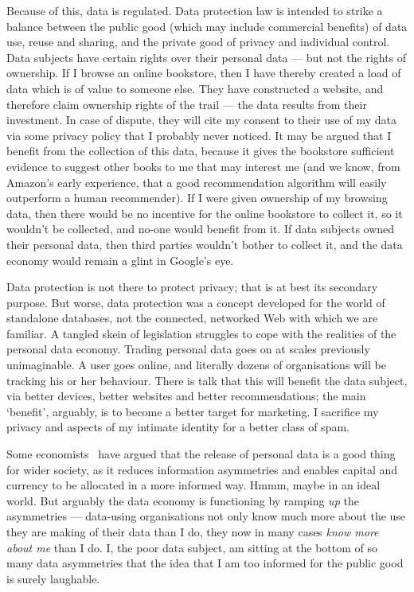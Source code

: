 \documentclass[graybox]{svmult}
\begin{document}
Because of this, data is regulated. Data protection law is intended to strike a balance between the public good (which may include commercial benefits) of data use, reuse and sharing, and the private good of privacy and individual control. Data subjects have certain rights over their personal data --- but not the rights of ownership. If I browse an online bookstore, then I have thereby created a load of data which is of value to someone else. They have constructed a website, and therefore claim ownership rights of the trail --- the data results from their investment. In case of dispute, they will cite my consent to their use of my data via some privacy policy that I probably never noticed. It may be argued that I benefit from the collection of this data, because it gives the bookstore sufficient evidence to suggest other books to me that may interest me (and we know, from Amazon's early experience, that a good recommendation algorithm will easily outperform a human recommender). If I were given ownership of my browsing data, then there would be no incentive for the online bookstore to collect it, so it wouldn't be collected, and no-one would benefit from it. If data subjects owned their personal data, then third parties wouldn't bother to collect it, and the data economy would remain a glint in Google's eye.

Data protection is not there to protect privacy; that is at best its secondary purpose. But worse, data protection was a concept developed for the world of standalone databases, not the connected, networked Web with which we are familiar. A tangled skein of legislation struggles to cope with the realities of the personal data economy. Trading personal data goes on at scales previously unimaginable. A user goes online, and literally dozens of organisations will be tracking his or her behaviour. There is talk that this will benefit the data subject, via better devices, better websites and better recommendations; the main `benefit', arguably, is to become a better target for marketing. I sacrifice my privacy and aspects of my intimate identity for a better class of spam.

Some economists~\cite{posner1981} have argued that the release of personal data is a good thing for wider society, as it reduces information asymmetries and enables capital and currency to be allocated in a more informed way. Hmmm, maybe in an ideal world. But arguably the data economy is functioning by ramping {\em up} the asymmetries --- data-using organisations not only know much more about the use they are making of their data than I do, they now in many cases {\em know more about me} than I do. I, the poor data subject, am sitting at the bottom of so many data asymmetries that the idea that I am too informed for the public good is surely laughable.
\end{document}
